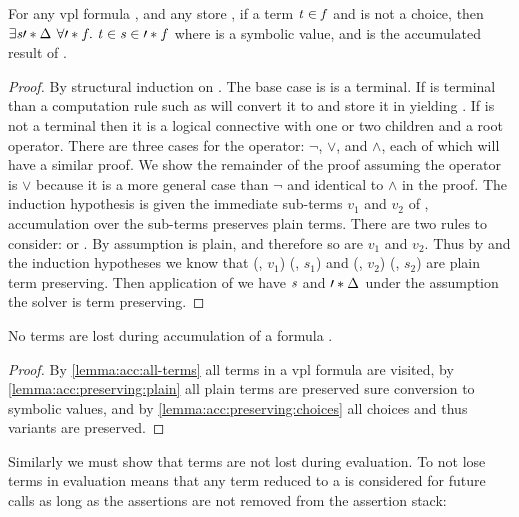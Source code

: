 \begin{lemma}
  \label{lemma:acc:preserving:plain}
  For any \ac{vpl} formula \fV, and any store \aStore{}, if a term $\mathit{t}{} \in
  \mathit{f}$ and \tV{} is not a choice, then $\exists\sV{}\prime*{\aStore{}}\ \forall\prime*{f}.\ \tV
  \in \sV{} \in \prime*{f}$ where \sV{} is a symbolic value, and  is
  the accumulated result of \fV{}.
\end{lemma}
%
\begin{proof}
  By structural induction on \tV{}. The base case is \tV{} is a terminal. If
  \tV{} is terminal than a computation rule such as \acRef{} will convert it to
  \sV{} and store it in \aStore{} yielding \prime*{\aStore{}}. If \tV{} is not a
  terminal then it is a logical connective with one or two children and a root
  operator. There are three cases for the operator: $\neg$, $\vee$, and
  $\wedge$, each of which will have a similar proof. We show the remainder of
  the proof assuming the operator is $\vee$ because it is a more general case
  than $\neg$ and identical to $\wedge$ in the proof. The induction hypothesis
  is given the immediate sub-terms $v_{1}$ and $v_{2}$ of \tV{}, accumulation
  over the sub-terms preserves plain terms. There are two rules to consider:
  \acOrS{} or \acOrV{}. By assumption \tV{} is plain, and therefore so are
  $v_{1}$ and $v_{2}$. Thus by \acOrS{} and the induction hypotheses we know
  that (\aStore{}, $v_1$) \accumulation (, $s_1$) and (,
  $v_2$) \accumulation (, $s_2$) are plain term preserving. Then
  application of \por{} we have $\mathit{s}$ and $\prime*{\Delta_{}}$ under the
  assumption the solver is term preserving.
\end{proof}
%
\begin{theorem}
  \label{thm:accumulation:term-preserving}
  No terms are lost during accumulation of a formula \fV{}.
\end{theorem}
%
\begin{proof}
  By \autoref{lemma:acc:all-terms} all terms in a \ac{vpl} formula are visited,
  by \autoref{lemma:acc:preserving:plain} all plain terms are preserved sure
  conversion to symbolic values, and by \autoref{lemma:acc:preserving:choices}
  all choices and thus variants are preserved.
\end{proof}

Similarly we must show that terms are not lost during evaluation. To not lose
terms in evaluation means that any term reduced to a \unit{} is considered for
future  calls as long as the assertions are not removed from the
assertion stack:

